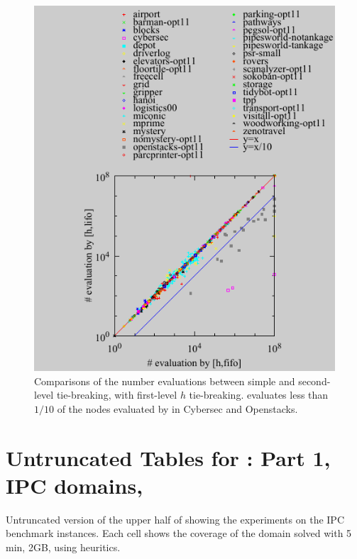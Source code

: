 \documentclass[10pt,letterpaper]{article}
\begin{document}
\begin{figure}[htb]
 \centering {}
 \includegraphics{tables/aaai16-30min-5min-cut/aaai16prelim3/evaluated-lmcut_ff-lmcut_lf.pdf}
 \caption{Comparisons of the number evaluations between simple \lifo and
 \fifo second-level tie-breaking, with first-level $h$
 tie-breaking. \lifo evaluates less than $1/10$ of the nodes evaluated
 by \fifo in Cybersec and Openstacks.}
 \label{f-h-eval-full}
\end{figure}

\clearpage
\onecolumn
\section{Untruncated Tables for  : Part 1, IPC domains, \lmcut}

\begin{table}[htb]
 {
 \centering
 
 \caption{
 Untruncated version of the upper half of  showing 
 the experiments on the IPC benchmark instances.
 Each cell shows the coverage of the domain solved with 5 min, 2GB,
 using \lmcut heuritics.
 }
 \label{lmcut-ipc-full}
 }
\end{table}
\end{document}
